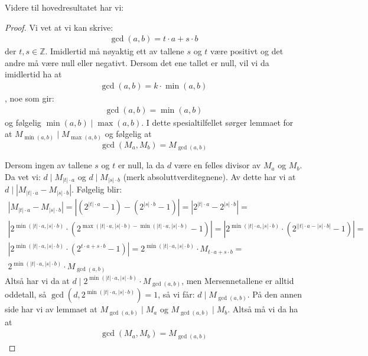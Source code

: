 \documentclass[a4paper,twoside]{article}
\theoremstyle{plain}
\newcommand{\setZ}{\mathbb{Z}}
\begin{document}
Videre til hovedresultatet har vi:
\begin{proof}
Vi vet at vi kan skrive:
\begin{align}
\gcd(a,b)=t\cdot a+s\cdot b
\end{align}
der $t,s \in \setZ$.
Imidlertid må nøyaktig ett av tallene $s$ og $t$ være positivt og det andre må være null eller negativt. Dersom det ene tallet er null, vil vi da imidlertid ha at 
\begin{align}
\gcd(a,b)=k\cdot \min(a,b)
\end{align}
, noe som gir:
\begin{align}
\gcd(a,b)=\min(a,b)
\end{align}
og følgelig
$\min(a,b)\mid \max(a,b)$. I dette spesialtilfellet sørger lemmaet for at $M_{\min(a,b)}\mid M_{\max(a,b)}$ og følgelig at 
\[\gcd\left(M_a,M_b\right)=M_{\gcd(a,b)} \]

Dersom ingen av tallene $s$ og $t$ er null, la da $d$ være en felles divisor av $M_a$ og $M_b$. Da vet vi:
$d\mid M_{|t|\cdot a}$ og $d\mid M_{|s|\cdot b}$ (merk absoluttverditegnene). Av dette har vi at $d\mid \left| M_{|t|\cdot a}-M_{|s|\cdot b}\right|$. Følgelig blir:
\begin{align}
\left| M_{|t|\cdot a}-M_{|s|\cdot b}\right|= \left| \left(2^{|t|\cdot a}-1\right)- \left(2^{|s|\cdot b}-1\right)\right|=\left| 2^{|t|\cdot a} -2^{|s|\cdot b}\right| =\\ \left| 2^{\min\left(|t|\cdot a,|s|\cdot b\right)}\cdot\left(2^{\max\left(|t|\cdot a,|s|\cdot b\right)-\min\left(|t|\cdot a,|s|\cdot b\right)}-1\right) \right|= \left| 2^{\min\left(|t|\cdot a,|s|\cdot b\right)}\cdot\left(2^{\left| |t|\cdot a-|s|\cdot b\right|}-1\right) \right|=\\
\left| 2^{\min\left(|t|\cdot a,|s|\cdot b\right)}\cdot\left(2^{t\cdot a+s\cdot b}-1\right) \right|=2^{\min\left(|t|\cdot a,|s|\cdot b\right)}\cdot M_{t\cdot a+s\cdot b}= \\ 2^{\min\left(|t|\cdot a,|s|\cdot b\right)}\cdot M_{\gcd(a,b)}
\end{align}
Altså har vi da at $d \mid 2^{\min\left(|t|\cdot a,|s|\cdot b\right)}\cdot M_{\gcd(a,b)}$, men Mersennetallene er alltid oddetall, så  $\gcd\left(d, 2^{\min\left(|t|\cdot a,|s|\cdot b\right)}\right)=1$, så vi får:
$d \mid M_{\gcd(a,b)}$. På den annen side har vi av lemmaet at $M_{\gcd(a,b)} \mid M_a$ og $M_{\gcd(a,b)} \mid M_b$. Altså må vi da ha at
\begin{align}
\gcd\left(M_a,M_b\right)=M_{\gcd(a,b)}
\end{align}
\end{proof}
\end{document}
